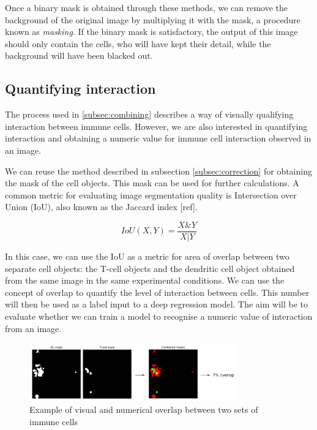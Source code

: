 Once a binary mask is obtained through these methods, we can remove the background of the original image by multiplying it with the mask, a procedure known as \textit{masking}. If the binary mask is satisfactory, the output of this image should only contain the cells, who will have kept their detail, while the background will have been blacked out.

\subsection{Quantifying interaction}

The process used in \autoref{subsec:combining} describes a way of visually qualifying interaction between immune cells. However, we are also interested in quantifying interaction and obtaining a numeric value for immune cell interaction observed in an image.

We can reuse the method described in subsection \ref{subsec:correction} for obtaining the mask of the cell objects. This mask can be used for further calculations. A common metric for evaluating image segmentation quality is Intersection over Union (IoU), also known as the Jaccard index [ref].

\begin{equation}
    IoU(X,Y) = \frac{X \& Y}{X | Y}
\end{equation}

In this case, we can use the IoU as a metric for area of overlap between two separate cell objects: the T-cell objects and the dendritic cell object obtained from the same image in the same experimental conditions. We can use the concept of overlap to quantify the level of interaction between cells. This number will then be used as a label input to a deep regression model. The aim will be to evaluate whether we can train a model to recognise a numeric value of interaction from an image.

\begin{figure}
    \centering
    \includegraphics[width=0.8\textwidth]{dissertation/figures/mask_overlap_operation.png}
    \caption{Example of visual and numerical overlap between two sets of immune cells}
    \label{fig:mask_overlap}
\end{figure}


